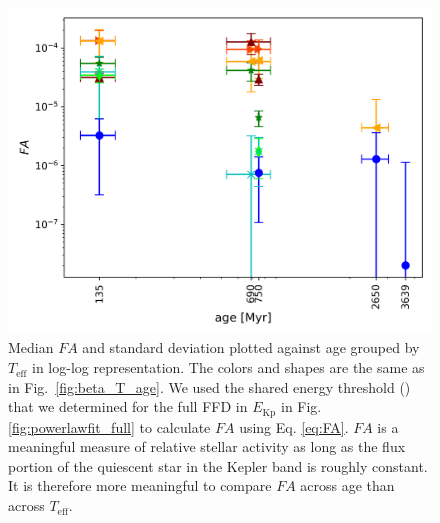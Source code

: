 \documentclass{aa}
\begin{document}
\begin{figure}[ht!]
    \centering
    \includegraphics[width=\hsize]{pics/FA/FA_T_age_Ethresh.png}
    \caption{Median $FA$ and standard deviation plotted against age grouped by $T_\mathrm{eff}$ in log-log representation. The colors and shapes are the same as in Fig.~\ref{fig:beta_T_age}. We used the shared energy threshold (\unskip) that we determined for the full FFD in $E_\mathrm{Kp}$ in Fig. \ref{fig:powerlawfit_full} to calculate $FA$ using Eq. \ref{eq:FA}. $FA$ is a meaningful measure of relative stellar activity as long as the flux portion of the quiescent star in the Kepler band is roughly constant. It is therefore more meaningful to compare $FA$ across age than across $T_\mathrm{eff}$.}   
    \label{fig:FA}
\end{figure}
\end{document}

